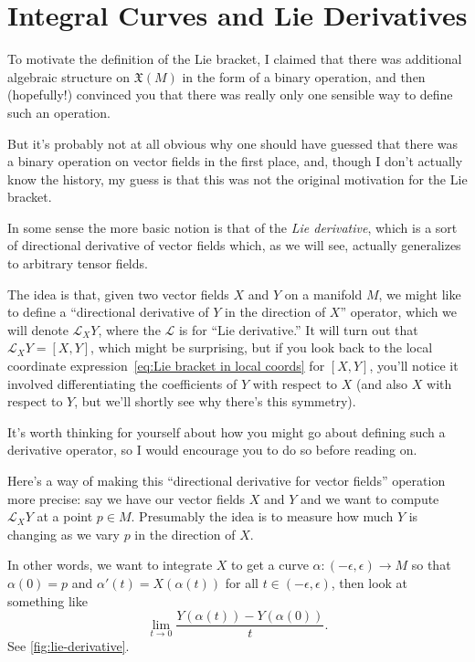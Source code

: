 
\section{Integral Curves and Lie Derivatives}

To motivate the definition of the Lie bracket, I claimed that there was additional algebraic structure on $\mathfrak{X}(M)$ in the form of a binary operation, and then (hopefully!) convinced you that there was really only one sensible way to define such an operation.

But it's probably not at all obvious why one should have guessed that there was a binary operation on vector fields in the first place, and, though I don't actually know the history, my guess is that this was not the original motivation for the Lie bracket.

In some sense the more basic notion is that of the \emph{Lie derivative}, which is a sort of directional derivative of vector fields which, as we will see, actually generalizes to arbitrary tensor fields.

The idea is that, given two vector fields $X$ and $Y$ on a manifold $M$, we might like to define a ``directional derivative of $Y$ in the direction of $X$'' operator, which we will denote $\mathcal{L}_XY$, where the $\mathcal{L}$ is for ``Lie derivative.'' It will turn out that $\mathcal{L}_XY = [X,Y]$, which might be surprising, but if you look back to the local coordinate expression~\eqref{eq:Lie bracket in local coords} for $[X,Y]$, you'll notice it involved differentiating the coefficients of $Y$ with respect to $X$ (and also $X$ with respect to $Y$, but we'll shortly see why there's this symmetry).

It's worth thinking for yourself about how you might go about defining such a derivative operator, so I would encourage you to do so before reading on.

Here's a way of making this ``directional derivative for vector fields'' operation more precise: say we have our vector fields $X$ and $Y$ and we want to compute $\mathcal{L}_XY$ at a point $p \in M$. Presumably the idea is to measure how much $Y$ is changing as we vary $p$ in the direction of $X$. 

In other words, we want to integrate $X$ to get a curve $\alpha: (-\epsilon, \epsilon) \to M$ so that $\alpha(0) = p$ and $\alpha'(t) = X(\alpha(t))$ for all $t \in (-\epsilon, \epsilon)$, then look at something like
\[
	\lim_{t\to 0} \frac{Y(\alpha(t))-Y(\alpha(0))}{t}.
\]
See \cref{fig:lie-derivative}.

